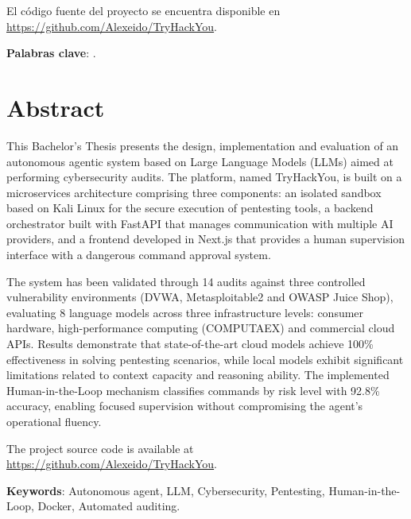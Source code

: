 \documentclass[hidelinks, headlogo, framedcover]{tfeEPCC}
\begin{document}
El código fuente del proyecto se encuentra disponible en \url{https://github.com/Alexeido/TryHackYou}.

\noindent\textbf{Palabras clave}: \printkeywords.

\cleardoublepage
\chapter*{Abstract}
This Bachelor's Thesis presents the design, implementation and evaluation of an autonomous agentic system based on Large Language Models (LLMs) aimed at performing cybersecurity audits. The platform, named TryHackYou, is built on a microservices architecture comprising three components: an isolated sandbox based on Kali Linux for the secure execution of pentesting tools, a backend orchestrator built with FastAPI that manages communication with multiple AI providers, and a frontend developed in Next.js that provides a human supervision interface with a dangerous command approval system.

The system has been validated through 14 audits against three controlled vulnerability environments (DVWA, Metasploitable2 and OWASP Juice Shop), evaluating 8 language models across three infrastructure levels: consumer hardware, high-performance computing (COMPUTAEX) and commercial cloud APIs. Results demonstrate that state-of-the-art cloud models achieve 100\% effectiveness in solving pentesting scenarios, while local models exhibit significant limitations related to context capacity and reasoning ability. The implemented Human-in-the-Loop mechanism classifies commands by risk level with 92.8\% accuracy, enabling focused supervision without compromising the agent's operational fluency.

The project source code is available at \url{https://github.com/Alexeido/TryHackYou}.

\noindent\textbf{Keywords}: Autonomous agent, LLM, Cybersecurity, Pentesting, Human-in-the-Loop, Docker, Automated auditing.

\cleardoublepage
\newpage
\pagestyle{plain}
\setcounter{page}{1}
\setcounter{tocdepth}{1}
\tableofcontents
\cleardoublepage
\listoftables
\cleardoublepage
\listoffigures
\cleardoublepage
\end{document}
